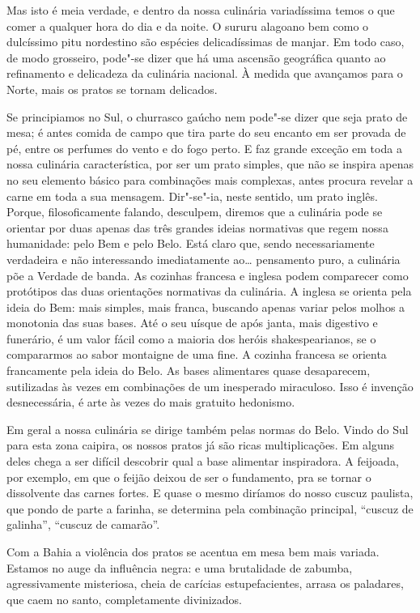 Mas isto é meia verdade, e dentro da nossa culinária variadíssima temos
o que comer a qualquer hora do dia e da noite. O sururu alagoano bem
como o dulcíssimo pitu nordestino são espécies delicadíssimas de manjar.
Em todo caso, de modo grosseiro, pode"-se dizer que há uma ascensão
geográfica quanto ao refinamento e delicadeza da culinária nacional. À
medida que avançamos para o Norte, mais os pratos se tornam delicados.

Se principiamos no Sul, o churrasco gaúcho nem pode"-se dizer que seja
prato de mesa; é antes comida de campo que tira parte do seu encanto em
ser provada de pé, entre os perfumes do vento e do fogo perto. E faz
grande exceção em toda a nossa culinária característica, por ser um
prato simples, que não se inspira apenas no seu elemento básico para
combinações mais complexas, antes procura revelar a carne em toda a sua
mensagem. Dir"-se"-ia, neste sentido, um prato inglês. Porque,
filosoficamente falando, desculpem, diremos que a culinária pode se
orientar por duas apenas das três grandes ideias normativas que regem
nossa humanidade: pelo Bem e pelo Belo. Está claro que, sendo
necessariamente verdadeira e não interessando imediatamente ao\ldots{}
pensamento puro, a culinária põe a Verdade de banda. As cozinhas
francesa e inglesa podem comparecer como protótipos das duas orientações
normativas da culinária. A inglesa se orienta pela ideia do Bem: mais
simples, mais franca, buscando apenas variar pelos molhos a monotonia
das suas bases. Até o seu uísque de após janta, mais digestivo e
funerário, é um valor fácil como a maioria dos heróis shakespearianos,
se o compararmos ao sabor montaigne de uma fine. A cozinha francesa se
orienta francamente pela ideia do Belo. As bases alimentares quase
desaparecem, sutilizadas às vezes em combinações de um inesperado
miraculoso. Isso é invenção desnecessária, é arte às vezes do mais
gratuito hedonismo.

Em geral a nossa culinária se dirige também pelas normas do Belo. Vindo
do Sul para esta zona caipira, os nossos pratos já são ricas
multiplicações. Em alguns deles chega a ser difícil descobrir qual a
base alimentar inspiradora. A feijoada, por exemplo, em que o feijão
deixou de ser o fundamento, pra se tornar o dissolvente das carnes
fortes. E quase o mesmo diríamos do nosso cuscuz paulista, que pondo de
parte a farinha, se determina pela combinação principal, ``cuscuz de
galinha'', ``cuscuz de camarão''.

Com a Bahia a violência dos pratos se acentua em mesa bem mais variada.
Estamos no auge da influência negra: e uma brutalidade de zabumba,
agressivamente misteriosa, cheia de carícias estupefacientes, arrasa os
paladares, que caem no santo, completamente divinizados.

